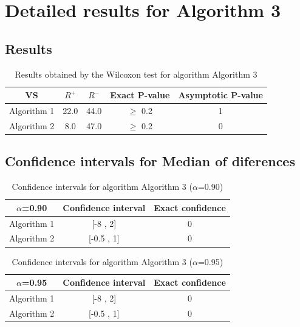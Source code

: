 \documentclass[a4paper,10pt]{article}
\begin{document}
 \clearpage 


\section{Detailed results for Algorithm 3}


\subsection{Results}

\begin{table}[!htp]
\centering\small
\begin{tabular}{
|c|c|c|c|c|}
\hline
 VS & $R^{+}$ & $R^{-}$ & Exact P-value & Asymptotic P-value \\ \hline 
Algorithm 1 & 22.0 & 44.0 & $\geq$ 0.2 & 1\\ \hline 
Algorithm 2 & 8.0 & 47.0 & $\geq$ 0.2 & 0\\ \hline 

\end{tabular}
\caption{Results obtained by the Wilcoxon test for algorithm Algorithm 3}
\end{table}

\subsection{Confidence intervals for Median of diferences}

\begin{table}[!htp]
\centering\small
\begin{tabular}{
|c|c|c|}
\hline
 $\alpha$=0.90 & Confidence interval & Exact confidence \\ \hline 
Algorithm 1 & [-8 , 2] & 0\\ \hline 
Algorithm 2 & [-0.5 , 1] & 0\\ \hline 

\end{tabular}
\caption{Confidence intervals for algorithm Algorithm 3 ($\alpha$=0.90)}
\end{table}
\begin{table}[!htp]
\centering\small
\begin{tabular}{
|c|c|c|}
\hline
 $\alpha$=0.95 & Confidence interval & Exact confidence \\ \hline 
Algorithm 1 & [-8 , 2] & 0\\ \hline 
Algorithm 2 & [-0.5 , 1] & 0\\ \hline 

\end{tabular}
\caption{Confidence intervals for algorithm Algorithm 3 ($\alpha$=0.95)}
\end{table}

 \clearpage 
\end{document}
